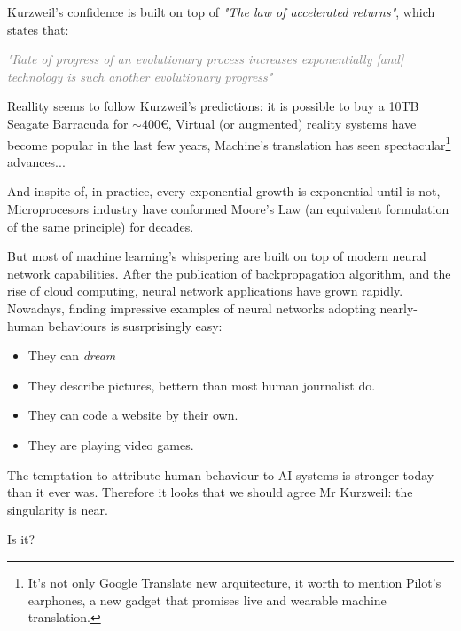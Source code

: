 Kurzweil's confidence is built on top of \textit{"The law of accelerated returns"}, 
which states that: 

\textcolor{gray}{
	\textit {
		\Large {
			"Rate of progress of an evolutionary process increases exponentially 
			[and] technology is such another evolutionary progress"
		}
	}
}

Reallity seems to follow Kurzweil's predictions: it is possible to buy a 10TB 
Seagate Barracuda for $\sim400$\euro{}, Virtual (or augmented) reality systems 
have become popular in the last few years, Machine's translation has seen 
spectacular\footnote{
	It's not only Google Translate new arquitecture, it worth to mention Pilot's 
	earphones, a new gadget that promises live and wearable machine translation.
} advances... 

And inspite of, in practice, every exponential growth is exponential until is not,
Microprocesors industry have conformed Moore's Law (an equivalent formulation of 
the same principle) for decades.

But most of machine learning's whispering are built on top of modern neural network
capabilities. After the publication of backpropagation algorithm, and the rise 
of cloud computing, neural network applications have grown rapidly. Nowadays, 
finding impressive examples of neural networks adopting nearly-human behaviours 
is susrprisingly easy: 

\begin{itemize}
	\item They can \textit{dream}
	\item They describe pictures, bettern than most human journalist do.
	\item They can code a website by their own.
	\item They are playing video games.
\end{itemize}

The temptation to attribute human behaviour to AI systems is stronger today than 
it ever was. Therefore it looks that we should agree Mr Kurzweil: the singularity 
is near. 

Is it?